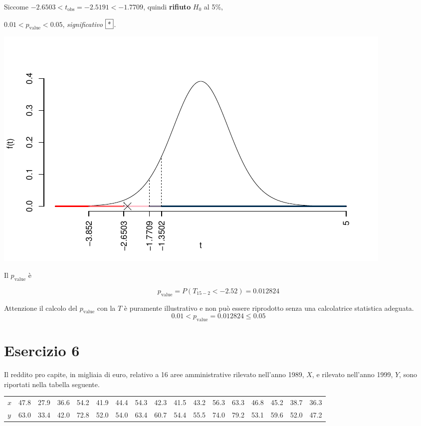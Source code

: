 \documentclass[
  11pt,
]{book}
\theoremstyle{mytheoremstyle}
\theoremstyle{mydefstyle}
\newenvironment{sol}
  {
  \begin{tcolorbox}[enhanced,breakable,arc=0.1mm,boxrule=1pt,colback=white,colframe=iblue,
  title=\bf \fontfamily{lmss}\selectfont \hspace{.5 cm} Soluzione,drop fuzzy shadow]

}{
\end{tcolorbox}
  }
\begin{document}
\begin{sol}
Siccome \(-2.6503<t_\text{obs}=-2.5191<-1.7709\), quindi \textbf{rifiuto} \(H_0\) al 5\%,

\(0.01<p_\text{value}<0.05\), \emph{significativo} \(\fbox{*}\).

\begin{center}\includegraphics{Esami_passati_con_soluzioni_files/figure-latex/06-regr-32,-1} \end{center}

Il \(p_{\text{value}}\) è

\[ p_{\text{value}} = P(T_{15-2}<-2.52)=0.012824 \]

Attenzione il calcolo del \(p_\text{value}\) con la \(T\) è puramente illustrativo e non può essere riprodotto senza una calcolatrice statistica adeguata.\[
 0.01 < p_\text{value}= 0.012824 \leq 0.05 
\]

\end{sol}

\section{Esercizio 6}\label{esercizio-6}

Il reddito pro capite, in migliaia di euro, relativo a 16 aree
amministrative rilevato nell'anno 1989, \(X\), e rilevato nell'anno
1999, \(Y\), sono riportati nella tabella seguente.

\footnotesize
\begin{table}[H]
\centering
\begin{tabular}{lrrrrrrrrrrrrrrrr}
\toprule
$x$ & 47.8 & 27.9 & 36.6 & 54.2 & 41.9 & 44.4 & 54.3 & 42.3 & 41.5 & 43.2 & 56.3 & 63.3 & 46.8 & 45.2 & 38.7 & 36.3\\
$y$ & 63.0 & 33.4 & 42.0 & 72.8 & 52.0 & 54.0 & 63.4 & 60.7 & 54.4 & 55.5 & 74.0 & 79.2 & 53.1 & 59.6 & 52.0 & 47.2\\
\bottomrule
\end{tabular}
\end{table}
\normalsize
\end{document}
